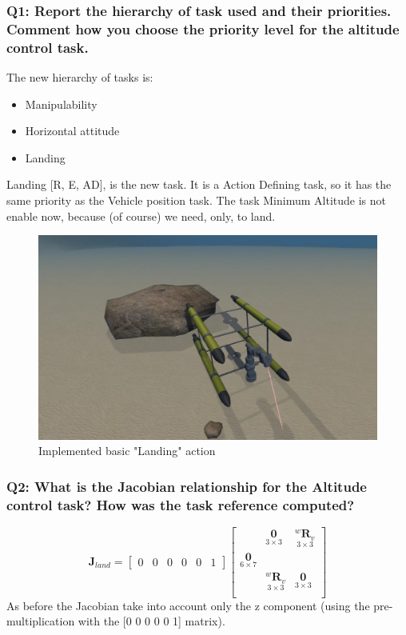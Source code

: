 \documentclass{article}
\begin{document}
\subsubsection{Q1: Report the hierarchy of task used and their priorities. Comment how you choose the priority level for the altitude control task.}
The new hierarchy of tasks is:
\begin{itemize}
	\item Manipulability
	\item Horizontal attitude
	\item Landing
\end{itemize}
Landing [R, E, AD], is the new task. It is a Action Defining task, so it has the same priority as the Vehicle position task.
The task Minimum Altitude is not enable now, because (of course) we need, only, to land.
\begin{figure}[h]
    \centering
    \includegraphics[scale=0.4]{211_Landing.png}
    \caption{Implemented basic "Landing" action}
    \label{images_2_3_1}
\end{figure}

\subsubsection{Q2: What is the Jacobian relationship for the Altitude control task? How was the task reference computed?}

\begin{equation}
\boldsymbol{J}_{land}=\begin{bmatrix} 0 & 0 & 0 & 0 & 0 & 1
\end{bmatrix}
    \begin{bmatrix}
     & \underset{3\times 3}{\boldsymbol{0}} & \underset{ 3\times 3}{^{w}\boldsymbol{R}_{v}} \\
     \underset{6\times 7}{\boldsymbol{0}} \\
     & \underset{ 3\times 3}{^{w}\boldsymbol{R}_{v}} & \underset{3\times 3}{\boldsymbol{0}} \\
    \end{bmatrix}
\end{equation}
As before the Jacobian take into account only the z component (using the pre-multiplication with the [0 0 0 0 0 1] matrix). 
\end{document}
